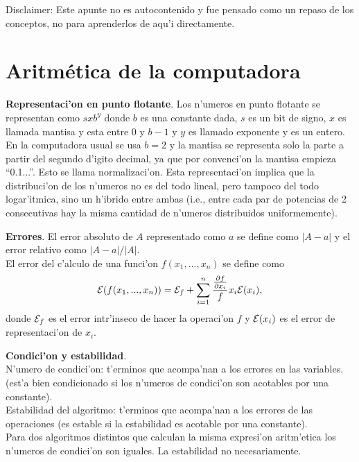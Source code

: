 \documentclass[a4paper,spanish]{article}
\newcommand{\parcial}[2]{\frac{\partial #1}{\partial #2}}
\newcommand{\error}[0]{{\cal E}}
\begin{document}
Disclaimer: Este apunte no es autocontenido y fue pensado como un repaso 
de los conceptos, no para aprenderlos de aqu'i directamente.


\section{Aritm\'etica de la computadora}

\textbf{Representaci'on en punto flotante}. Los n'umeros en punto flotante
se representan como $s x b^y$ donde $b$ es una constante dada, $s$ es un bit
de signo, $x$ es llamada mantisa y esta entre 0 y $b-1$ y $y$ es llamado
exponente y es un entero. En la computadora usual se usa $b=2$ y la mantisa se
representa solo la parte a partir del segundo d'igito decimal, ya que por
convenci'on la mantisa empieza ``0.1...''. Esto se llama normalizaci'on.
Esta representaci'on implica que la distribuci'on de los n'umeros no es
del todo lineal, pero tampoco del todo logar'itmica, sino un h'ibrido entre
ambas (i.e., entre cada par de potencias de 2 consecutivas hay la misma
cantidad de n'umeros distribuidos uniformemente).

\textbf{Errores}. El error absoluto de $A$ representado como $a$ se define
como $|A-a|$ y el error relativo como $|A-a|/|A|$. \\
El error del c'alculo de una funci'on $f(x_1,...,x_n)$ se define como
$$\error(f(x_1,...,x_n)) = 
	\error_f + \sum_{i=1}^n \frac{\parcial{f}{x_i}}{f} x_i \error(x_i),$$
donde $\error_f$ es el error intr'inseco de hacer la operaci'on $f$ y 
$\error(x_i)$ es el error de representaci'on de $x_i$.

\textbf{Condici'on y estabilidad}. \\
N'umero de condici'on: t'erminos que acompa'nan a los errores en las variables.
(est'a bien condicionado si los n'umeros de condici'on son acotables por
una constante). \\
Estabilidad del algoritmo: t'erminos que acompa'nan a los errores de las
operaciones (es estable si la estabilidad es acotable por una constante). \\
Para dos algoritmos distintos que calculan la misma expresi'on aritm'etica
los n'umeros de condici'on son iguales. La estabilidad no necesariamente.

\vspace{0.8cm}
\end{document}
